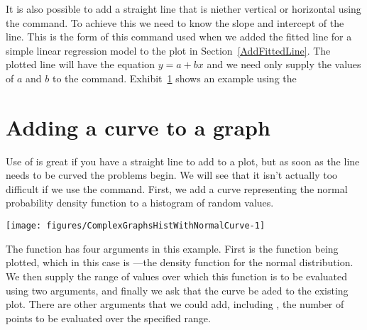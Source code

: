 It is also possible to add a straight line that is niether vertical or horizontal using the  command. To achieve this we need to know the slope and intercept of the line. This is the form of this command used when we added the fitted line for a simple linear regression model to the plot in Section~\ref{AddFittedLine}. The plotted line will have the equation $y=a+bx$ and we need only supply the values of $a$ and $b$ to the  command. Exhibit~\ref{} shows an example using the  
 
\section{Adding a curve to a graph} 
 
Use of  is great if you have a straight line to add to a plot, but as soon as the line needs to be curved the problems begin. We will see that it isn't actually too difficult if we use the  command. First, we add a curve representing the normal probability density function to a histogram of random values. 
\begin{knitrout}
\color{fgcolor}\begin{kframe}
\begin{alltt}
\hlstd{> }\hlstd{(}\hlstd{(}\hlstd{))}
\hlstd{> }\hlstd{(} \hlopt{-}\hlstd{,}\hlstd{,} \hlstd{=}\hlstd{)}
\end{alltt}
\end{kframe}
\texttt{[image: figures/ComplexGraphsHistWithNormalCurve-1]} 

\end{knitrout}
 
The  function has four arguments in this example. First is the function being plotted, which in this case is  ---the density function for the normal distribution. We then supply the range of values over which this function is to be evaluated using two arguments, and finally we ask that the curve be aded to the existing plot. There are other arguments that we could add, including , the number of points to be evaluated over the specified range. 
 
